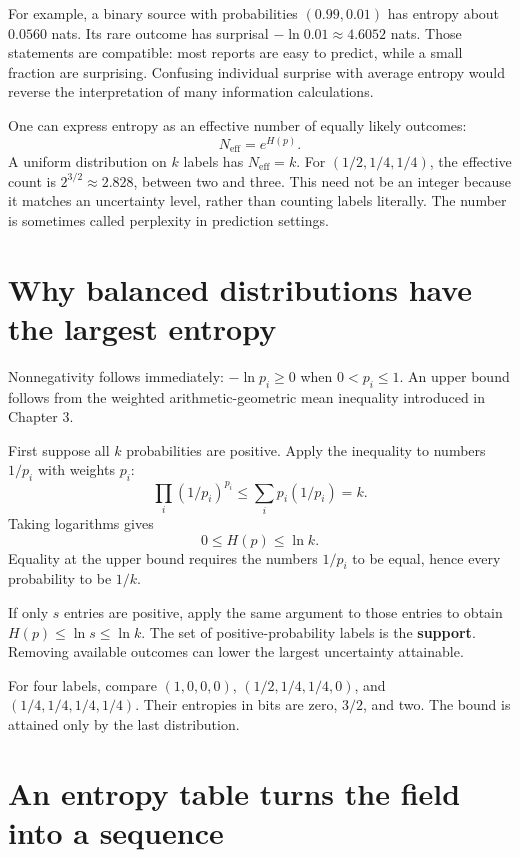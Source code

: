 \documentclass[11pt,oneside,openany]{book}
\theoremstyle{definition}
\theoremstyle{remark}
\numberwithin{equation}{chapter}
\begin{document}
For example, a binary source with probabilities \((0.99,0.01)\) has entropy about \(0.0560\) nats. Its rare outcome has surprisal \(-\ln0.01\approx4.6052\) nats. Those statements are compatible: most reports are easy to predict, while a small fraction are surprising. Confusing individual surprise with average entropy would reverse the interpretation of many information calculations.

One can express entropy as an effective number of equally likely outcomes: \[N_{\mathrm{eff}}=e^{H(p)}.\] A uniform distribution on \(k\) labels has \(N_{\mathrm{eff}}=k\). For \((1/2,1/4,1/4)\), the effective count is \(2^{3/2}\approx2.828\), between two and three. This need not be an integer because it matches an uncertainty level, rather than counting labels literally. The number is sometimes called perplexity in prediction settings.

\section{Why balanced distributions have the largest entropy}\label{ch05-why-balanced-distributions-have-the-largest-entropy}

Nonnegativity follows immediately: \(-\ln p_i\geq0\) when \(0<p_i\leq1\). An upper bound follows from the weighted arithmetic-geometric mean inequality introduced in Chapter 3.

First suppose all \(k\) probabilities are positive. Apply the inequality to numbers \(1/p_i\) with weights \(p_i\): \[\prod_i(1/p_i)^{p_i}\leq\sum_i p_i(1/p_i)=k.\] Taking logarithms gives \[\boxed{0\leq H(p)\leq\ln k.}\] Equality at the upper bound requires the numbers \(1/p_i\) to be equal, hence every probability to be \(1/k\).

If only \(s\) entries are positive, apply the same argument to those entries to obtain \(H(p)\leq\ln s\leq\ln k\). The set of positive-probability labels is the \textbf{support}. Removing available outcomes can lower the largest uncertainty attainable.

For four labels, compare \((1,0,0,0)\), \((1/2,1/4,1/4,0)\), and \((1/4,1/4,1/4,1/4)\). Their entropies in bits are zero, \(3/2\), and two. The bound is attained only by the last distribution.

\section{An entropy table turns the field into a sequence}\label{ch05-an-entropy-table-turns-the-field-into-a-sequence}
\end{document}
